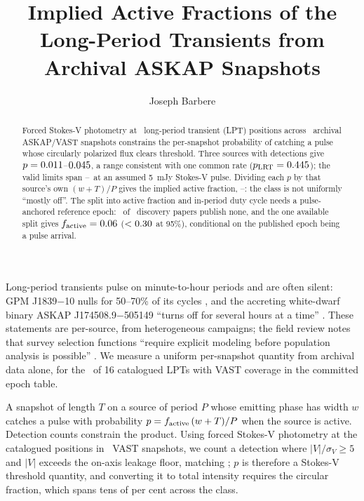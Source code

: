 \documentclass[RNAAS]{aastex631}
\begin{document}
\title{Implied Active Fractions of the Long-Period Transients from Archival ASKAP
Snapshots}

\author[0009-0008-3289-4447]{Joseph Barbere}

\begin{abstract}
Forced Stokes-V photometry at \ldNSources\ long-period transient (LPT) positions across
\ldNEpochs\ archival ASKAP/VAST snapshots constrains the per-snapshot probability of catching
a pulse whose circularly polarized flux clears threshold. Three sources with
detections give $p = 0.011$--$0.045$, a range consistent with one common rate
($p_{\rm LRT} = 0.445$); the valid limits span \ldLimMin--\ldLimMax\ at an assumed
5~mJy Stokes-V pulse. Dividing each $p$ by that source's own $(w+T)/P$ gives the implied
active fraction, \ldFaDetMin--\ldFaDetMax: the class is not uniformly ``mostly off''. The
split into active fraction and in-period duty cycle needs a pulse-anchored reference epoch:
\ldNNoEpoch\ of \ldNSources\ discovery papers publish none, and the one available split gives
$f_{\rm active} = 0.06$ ($<0.30$ at 95\%), conditional on the published
epoch being a pulse arrival.
\end{abstract}

\section{}

Long-period transients pulse on minute-to-hour periods and are often silent: GPM
J1839$-$10 nulls for 50--70\% of its cycles \citep{hurleywalker2023}, and the accreting
white-dwarf binary ASKAP J174508.9$-$505149 ``turns off for several hours at a time''
\citep{rose2026}. These statements are per-source, from heterogeneous campaigns; the field
review notes that survey selection functions ``require explicit modeling before population
analysis is possible'' \citep{rea2026}. We measure a uniform per-snapshot quantity from
archival data alone, for the \ldNSources\ of 16 catalogued LPTs with VAST coverage in the
committed epoch table.

A snapshot of length $T$ on a source of period $P$ whose emitting phase has width $w$ catches
a pulse with probability $p = f_{\rm active}\,(w+T)/P$ when the source is active. Detection
counts constrain the product. Using forced Stokes-V photometry at the catalogued positions in
\ldNEpochs\ VAST snapshots, we count a detection where $|V|/\sigma_V \ge 5$ and $|V|$ exceeds
the on-axis leakage floor, matching \citet{barbere2026lptv}; $p$ is therefore a Stokes-V
threshold quantity, and converting it to total intensity requires the circular fraction,
which spans tens of per cent across the class.
\end{document}
